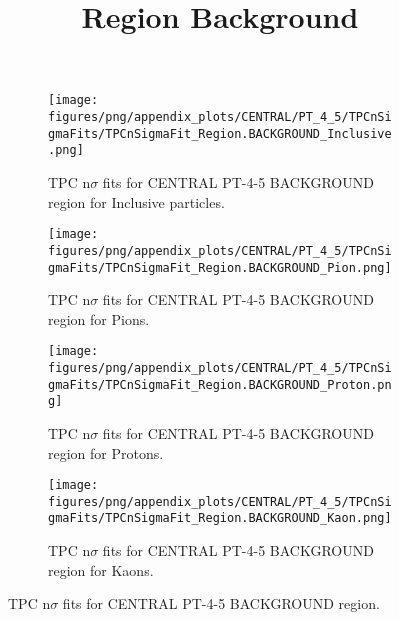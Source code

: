             \begin{figure}[H]
                \title{Region Background}
                \begin{subfigure}[b]{0.5\textwidth}
                    \centering
                    \texttt{[image: figures/png/appendix\_plots/CENTRAL/PT\_4\_5/TPCnSigmaFits/TPCnSigmaFit\_Region.BACKGROUND\_Inclusive.png]}
                    \caption{TPC n$\sigma$ fits for CENTRAL PT-4-5 BACKGROUND region for Inclusive particles.}
                    \label{fig:appendix_CENTRAL_PT-4-5_BACKGROUND_Inclusive}
                \end{subfigure}
                \begin{subfigure}[b]{0.5\textwidth}
                    \centering
                    \texttt{[image: figures/png/appendix\_plots/CENTRAL/PT\_4\_5/TPCnSigmaFits/TPCnSigmaFit\_Region.BACKGROUND\_Pion.png]}
                    \caption{TPC n$\sigma$ fits for CENTRAL PT-4-5 BACKGROUND region for Pions.}
                    \label{fig:appendix_CENTRAL_PT-4-5_BACKGROUND_Pion}
                \end{subfigure}
                \begin{subfigure}[b]{0.5\textwidth}
                    \centering
                    \texttt{[image: figures/png/appendix\_plots/CENTRAL/PT\_4\_5/TPCnSigmaFits/TPCnSigmaFit\_Region.BACKGROUND\_Proton.png]}
                    \caption{TPC n$\sigma$ fits for CENTRAL PT-4-5 BACKGROUND region for Protons.}
                    \label{fig:appendix_CENTRAL_PT-4-5_BACKGROUND_Proton}
                \end{subfigure}
                \begin{subfigure}[b]{0.5\textwidth}
                    \centering
                    \texttt{[image: figures/png/appendix\_plots/CENTRAL/PT\_4\_5/TPCnSigmaFits/TPCnSigmaFit\_Region.BACKGROUND\_Kaon.png]}
                    \caption{TPC n$\sigma$ fits for CENTRAL PT-4-5 BACKGROUND region for Kaons.}
                    \label{fig:appendix_CENTRAL_PT-4-5_BACKGROUND_Kaon}
                \end{subfigure}
                \caption{TPC n$\sigma$ fits for CENTRAL PT-4-5 BACKGROUND region.}
                \label{fig:appendix_CENTRAL_PT-4-5_BACKGROUND}
            \end{figure}
            \clearpage
            
    
